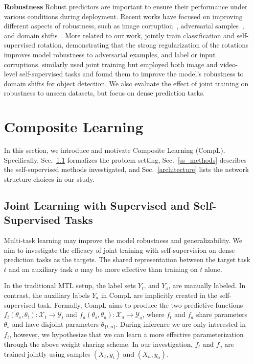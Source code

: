 \documentclass[10pt,twocolumn,letterpaper]{article}
\newcommand{\parsection}[1]{\vspace{1mm}\noindent\textbf{#1 }}
\begin{document}
\parsection{Robustness}
Robust predictors are important to ensure their performance under various conditions during deployment.
Recent works have focused on improving different aspects of robustness, such as image corruption~\cite{hendrycks2019benchmarking}, adversarial samples~\cite{zhang2019theoretically}, and domain shifts~\cite{yu2020bdd100k}.
More related to our work, \cite{hendrycks2019using} jointly train classification and self-supervised rotation, demonstrating that the strong regularization of the rotations improves model robustness to adversarial examples, and label or input corruptions. 
\cite{wang2021robust} similarly used joint training but employed both image and video-level self-supervised tasks and found them to improve the model's robustness to domain shifts for object detection.
We also evaluate the effect of joint training on robustness to unseen datasets, but focus on dense prediction tasks.
 \section{Composite Learning}

In this section, we introduce and motivate Composite Learning (CompL). 
Specifically, Sec.~\ref{method} formalizes the problem setting, Sec.~\ref{ss_methods} describes the self-supervised methods investigated, and Sec.~\ref{architecture} lists the network structure choices in our study.

\subsection{Joint Learning with Supervised and Self-Supervised Tasks}
\label{method}

Multi-task learning may improve the model robustness and generalizability. We aim to investigate the efficacy of joint training with self-supervision on dense prediction tasks as the targets.
The shared representation between the target task $t$ and an auxiliary task $a$ may be more effective than training on $t$ alone.

In the traditional MTL setup, the label sets $Y_t$, and $Y_a$, are manually labeled. 
In contrast, the auxiliary labels $Y_a$ in CompL are implicitly created in the self-supervised task.
Formally, CompL aims to produce the two predictive functions $f_t(\theta_{s},\theta_{t}): \mathcal{X}_t \rightarrow \mathcal{Y}_t$ and $f_a(\theta_{s},\theta_{a}): \mathcal{X}_a \rightarrow \mathcal{Y}_a$, where $f_t$ and $f_a$ share parameters $\theta_{s}$ and have disjoint parameters $\theta_{\{t,a\}}$.
During inference we are only interested in $f_t$, however, we hypothesize that we can learn a more effective parameterization through the above weight sharing scheme. 
In our investigation, $f_t$ and $f_a$ are trained jointly using samples $(X_t, y_t)$ and $(X_a, y_a)$.
\end{document}

